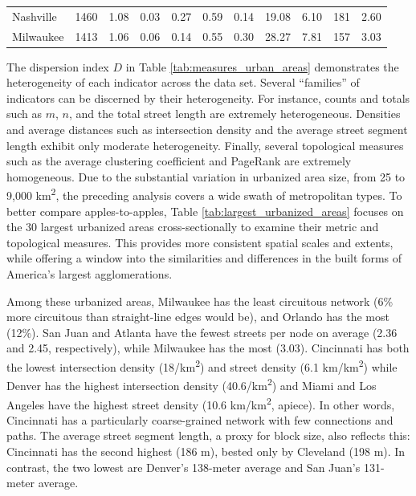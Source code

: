 \documentclass[Afour,sageh,times]{sagej}
\begin{document}
\begin{landscape}
\begin{table}
\begin{tabular}{p{2.5cm} p{1.5cm} p{1.5cm} p{1.5cm} p{1.55cm} p{1.5cm} p{1.5cm} p{1.5cm} p{1.5cm} p{1.5cm} p{1.5cm}}
Nashville            & 1460          & 1.08         & 0.03                       & 0.27           & 0.59        & 0.14        & 19.08                 & 6.10                  & 181                   & 2.60             \\
Milwaukee            & 1413          & 1.06         & 0.06                       & 0.14           & 0.55        & 0.30        & 28.27                 & 7.81                  & 157                   & 3.03 \\
\bottomrule
\end{tabular}
\end{table}
\end{landscape}
\restoregeometry

The dispersion index $D$ in Table \ref{tab:measures_urban_areas} demonstrates the heterogeneity of each indicator across the data set. Several \enquote{families} of indicators can be discerned by their heterogeneity. For instance, counts and totals such as $m$, $n$, and the total street length are extremely heterogeneous. Densities and average distances such as intersection density and the average street segment length exhibit only moderate heterogeneity. Finally, several topological measures such as the average clustering coefficient and PageRank are extremely homogeneous. Due to the substantial variation in urbanized area size, from 25 to 9,000 km\textsuperscript{2}, the preceding analysis covers a wide swath of metropolitan types. To better compare apples-to-apples, Table \ref{tab:largest_urbanized_areas} focuses on the 30 largest urbanized areas cross-sectionally to examine their metric and topological measures. This provides more consistent spatial scales and extents, while offering a window into the similarities and differences in the built forms of America's largest agglomerations. 

Among these urbanized areas, Milwaukee has the least circuitous network (6\% more circuitous than straight-line edges would be), and Orlando has the most (12\%). San Juan and Atlanta have the fewest streets per node on average (2.36 and 2.45, respectively), while Milwaukee has the most (3.03). Cincinnati has both the lowest intersection density (18/km\textsuperscript{2}) and street density (6.1 km/km\textsuperscript{2}) while Denver has the highest intersection density (40.6/km\textsuperscript{2}) and Miami and Los Angeles have the highest street density (10.6 km/km\textsuperscript{2}, apiece). In other words, Cincinnati has a particularly coarse-grained network with few connections and paths. The average street segment length, a proxy for block size, also reflects this: Cincinnati has the second highest (186 m), bested only by Cleveland (198 m). In contrast, the two lowest are Denver's 138-meter average and San Juan's 131-meter average.
\end{document}
